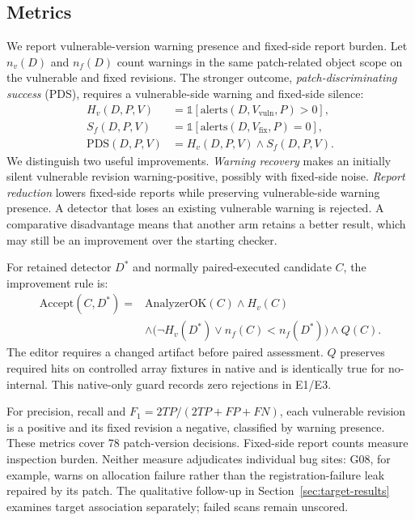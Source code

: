 \subsection{Metrics}

We report vulnerable-version warning presence and fixed-side report burden.
Let $n_v(D)$ and $n_f(D)$ count warnings in the same patch-related object scope on the vulnerable and fixed revisions.
The stronger outcome, \emph{patch-discriminating success} (PDS), requires a vulnerable-side warning and fixed-side silence:
\begin{equation}
\begin{aligned}
H_v(D,P,V)&=\mathbb{1}[\mathrm{alerts}(D,V_{\mathrm{vuln}},P)>0],\\
S_f(D,P,V)&=\mathbb{1}[\mathrm{alerts}(D,V_{\mathrm{fix}},P)=0],\\
\mathrm{PDS}(D,P,V)&=H_v(D,P,V)\land S_f(D,P,V).
\end{aligned}
\label{eq:pds}
\end{equation}
We distinguish two useful improvements.
\emph{Warning recovery} makes an initially silent vulnerable revision warning-positive, possibly with fixed-side noise.
\emph{Report reduction} lowers fixed-side reports while preserving vulnerable-side warning presence.
A detector that loses an existing vulnerable warning is rejected.
A comparative disadvantage means that another arm retains a better result, which may still be an improvement over the starting checker.

For retained detector $D^*$ and normally paired-executed candidate $C$, the improvement rule is:
\begin{equation}
\begin{aligned}
\mathrm{Accept}(C,D^*)={}&\mathrm{AnalyzerOK}(C)\land H_v(C)\\
&\land\bigl(\neg H_v(D^*)\lor n_f(C)<n_f(D^*)\bigr)\land Q(C).
\end{aligned}
\label{eq:accept}
\end{equation}
The editor requires a changed artifact before paired assessment.
$Q$ preserves required hits on controlled array fixtures in native and is identically true for no-internal.
This native-only guard records zero rejections in E1/E3.

For precision, recall and $F_1=2TP/(2TP+FP+FN)$, each vulnerable revision is a positive and its fixed revision a negative, classified by warning presence.
These metrics cover 78 patch-version decisions.
Fixed-side report counts measure inspection burden.
Neither measure adjudicates individual bug sites: G08, for example, warns on allocation failure rather than the registration-failure leak repaired by its patch.
The qualitative follow-up in Section~\ref{sec:target-results} examines target association separately; failed scans remain unscored.
